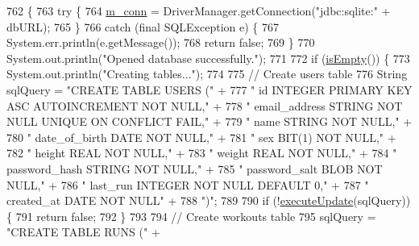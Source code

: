 \begin{DoxyCode}
762                                      \{
763         \textcolor{keywordflow}{try} \{
764             \mbox{\hyperlink{classcom_1_1activitytracker_1_1_d_b_manager_a064088d13ac09eb147fdc19268771521}{m\_conn}} = DriverManager.getConnection(\textcolor{stringliteral}{"jdbc:sqlite:"} + dbURL);
765         \}
766         \textcolor{keywordflow}{catch} (\textcolor{keyword}{final} SQLException e) \{
767             System.err.println(e.getMessage());
768             \textcolor{keywordflow}{return} \textcolor{keyword}{false};
769         \}
770         System.out.println(\textcolor{stringliteral}{"Opened database successfully."});
771 
772         \textcolor{keywordflow}{if} (\mbox{\hyperlink{classcom_1_1activitytracker_1_1_d_b_manager_af9ab112f840e3c803b6b28a2f1a15215}{isEmpty}}()) \{
773             System.out.println(\textcolor{stringliteral}{"Creating tables..."});
774 
775             \textcolor{comment}{// Create users table}
776             String sqlQuery = \textcolor{stringliteral}{"CREATE TABLE USERS ("} +
777                     \textcolor{stringliteral}{"    id            INTEGER PRIMARY KEY ASC AUTOINCREMENT NOT NULL,"} +
778                     \textcolor{stringliteral}{"    email\_address STRING  NOT NULL UNIQUE ON CONFLICT FAIL,"} +
779                     \textcolor{stringliteral}{"    name          STRING  NOT NULL,"} +
780                     \textcolor{stringliteral}{"    date\_of\_birth DATE    NOT NULL,"} +
781                     \textcolor{stringliteral}{"    sex           BIT(1)  NOT NULL,"} +
782                     \textcolor{stringliteral}{"    height        REAL    NOT NULL,"} +
783                     \textcolor{stringliteral}{"    weight        REAL    NOT NULL,"} +
784                     \textcolor{stringliteral}{"    password\_hash STRING  NOT NULL,"} +
785                     \textcolor{stringliteral}{"    password\_salt BLOB    NOT NULL,"} +
786                     \textcolor{stringliteral}{"    last\_run  INTEGER NOT NULL DEFAULT 0,"} +
787                     \textcolor{stringliteral}{"    created\_at    DATE    NOT NULL"} +
788                     \textcolor{stringliteral}{")"};
789 
790             \textcolor{keywordflow}{if} (!\mbox{\hyperlink{classcom_1_1activitytracker_1_1_d_b_manager_a382397e2bdf309901d1c80ff66be69b7}{executeUpdate}}(sqlQuery)) \{
791                 \textcolor{keywordflow}{return} \textcolor{keyword}{false};
792             \}
793 
794             \textcolor{comment}{// Create workouts table}
795             sqlQuery = \textcolor{stringliteral}{"CREATE TABLE RUNS ("} +

\end{DoxyCode}

